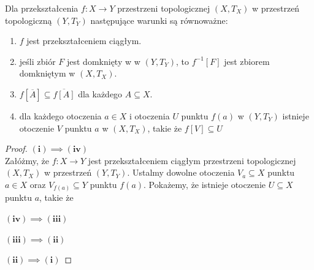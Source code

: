 \begin{theorem}
	Dla przekształcenia $f: X \to Y$ przestrzeni topologicznej $\left( X,T_{X} \right) $ w przestrzeń topologiczną $\left( Y, T_{Y} \right) $ następujące warunki są równoważne:
	\begin{enumerate}[label=(\roman*)]
		\item $f$ jest przekształceniem ciągłym.
		\item jeśli zbiór $F$ jest domknięty w w $\left( Y,T_{Y} \right) $, to $f^{-1}\left[ F \right] $ jest zbiorem domkniętym w $\left( X,T_{X} \right) $.
		\item $f\left[ \overline{A} \right] \subseteq \overline{f\left[ A \right] }$ dla każdego $A \subseteq X$.
		\item dla każdego otoczenia $a \in X$ i otoczenia $U$ punktu $f\left( a \right) $ w $\left( Y,T_{Y} \right) $ istnieje otoczenie $V$ punktu $a$ w $\left( X,T_{X} \right) $, takie że $f\left[ V \right] \subseteq U$
	\end{enumerate}
\end{theorem} 
\begin{proof}
\noindent $\bm{\left( i \right) \implies \left( iv \right)   } $ \\

Załóżmy, że $f: X\to Y$ jest przekształceniem ciągłym przestrzeni topologicznej $\left( X, T_{X} \right) $ w przestrzeń $\left( Y, T_{Y} \right) $. Ustalmy dowolne otoczenia $V_{a} \subseteq X$ punktu $a\in X$ oraz $V_{f\left( a \right) } \subseteq Y$ punktu $f\left( a \right) $. Pokażemy, że istnieje otoczenie $U \subseteq X$ punktu $a$, takie że 

\noindent $\bm{ \left( iv \right) \implies \left( iii \right)  } $

\noindent $\bm{ \left( iii \right) \implies \left( ii \right)  } $ 

\noindent $\bm{ \left( ii \right) \implies \left( i \right)  } $
\end{proof} 

